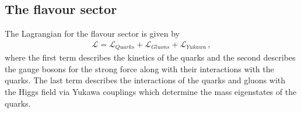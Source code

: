 
\subsection{The flavour sector}

The Lagrangian for the flavour sector is given by
\begin{align}
\mathcal{L} = \mathcal{L}_{Quarks} + \mathcal{L}_{Gluons}  + \mathcal{L}_{Yukawa} \, ,
\end{align}
where the first term describes the kinetics of the quarks and the second  
describes the gauge bosons for the strong force along with their interactions with the quarks.
The last term describes the interactions of the quarks and gluons with the Higgs field via Yukawa couplings which determine the 
mass eigenstates of the quarks.

